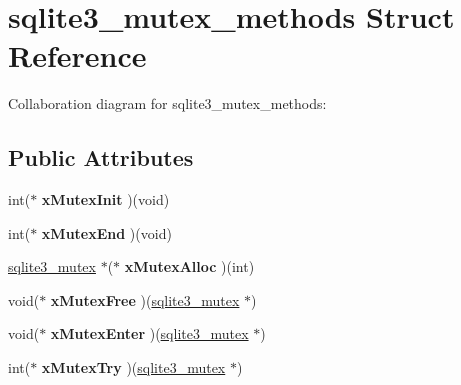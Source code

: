\hypertarget{structsqlite3__mutex__methods}{\section{sqlite3\+\_\+mutex\+\_\+methods Struct Reference}
\label{structsqlite3__mutex__methods}
}


Collaboration diagram for sqlite3\+\_\+mutex\+\_\+methods\+:
\subsection*{Public Attributes}
\begin{DoxyCompactItemize}
\item 
\hypertarget{structsqlite3__mutex__methods_af0a78d79b6029444d4a2ac7c474030d4}{int($\ast$ {\bfseries x\+Mutex\+Init} )(void)}\label{structsqlite3__mutex__methods_af0a78d79b6029444d4a2ac7c474030d4}

\item 
\hypertarget{structsqlite3__mutex__methods_a4963efb4bfede244d4d2a14510dbfe68}{int($\ast$ {\bfseries x\+Mutex\+End} )(void)}\label{structsqlite3__mutex__methods_a4963efb4bfede244d4d2a14510dbfe68}

\item 
\hypertarget{structsqlite3__mutex__methods_a1092d5c1659c494c5235e884def5e275}{\hyperlink{structsqlite3__mutex}{sqlite3\+\_\+mutex} $\ast$($\ast$ {\bfseries x\+Mutex\+Alloc} )(int)}\label{structsqlite3__mutex__methods_a1092d5c1659c494c5235e884def5e275}

\item 
\hypertarget{structsqlite3__mutex__methods_a4e58d446a7225ce91073eb0af91d219a}{void($\ast$ {\bfseries x\+Mutex\+Free} )(\hyperlink{structsqlite3__mutex}{sqlite3\+\_\+mutex} $\ast$)}\label{structsqlite3__mutex__methods_a4e58d446a7225ce91073eb0af91d219a}

\item 
\hypertarget{structsqlite3__mutex__methods_ac60f7bb165e9770949a8a2b2c2632830}{void($\ast$ {\bfseries x\+Mutex\+Enter} )(\hyperlink{structsqlite3__mutex}{sqlite3\+\_\+mutex} $\ast$)}\label{structsqlite3__mutex__methods_ac60f7bb165e9770949a8a2b2c2632830}

\item 
\hypertarget{structsqlite3__mutex__methods_a45682df41bdfcb267a696090c80ebd06}{int($\ast$ {\bfseries x\+Mutex\+Try} )(\hyperlink{structsqlite3__mutex}{sqlite3\+\_\+mutex} $\ast$)}\label{structsqlite3__mutex__methods_a45682df41bdfcb267a696090c80ebd06}


\end{DoxyCompactItemize}
